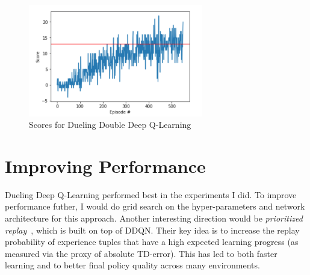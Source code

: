 \documentclass[tog]{acmsiggraph}
\begin{document}
\begin{figure}[h]
	\centering
	\includegraphics[width=3.0in]{images/dueling-double-dqn-scores}
	\caption{Scores for Dueling Double Deep Q-Learning}
	\label{fig:dueling-double-dqn-scores}
\end{figure}


\section{Improving Performance}

Dueling Deep Q-Learning performed best in the experiments I did.  To improve performance futher, I would do grid search on the hyper-parameters and network architecture for this approach.  Another interesting direction would be {\em prioritized replay}~\cite{DBLP:journals/corr/SchaulQAS15}, which is
 built on top of DDQN.  Their key idea is
to increase the replay probability of experience tuples
that have a high expected learning progress (as measured
via the proxy of absolute TD-error). This has led to both
faster learning and to better final policy quality across
many environments.


%

\end{document}
